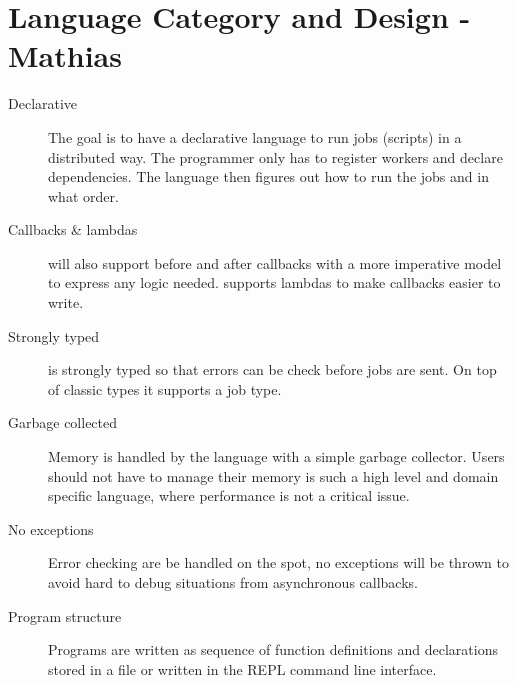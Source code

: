 \section{Language Category and Design - Mathias}
\label{sect:desg}
\begin{description}
\item[Declarative] The goal is to have a declarative language to run jobs
(scripts) in a distributed way. The programmer only has to register workers and
declare dependencies. The language then figures out how to run the jobs and in
what order.
\item[Callbacks \& lambdas] \lang will also support before and after callbacks
with a more imperative model to express any logic needed. \lang supports
lambdas to make callbacks easier to write.
\item[Strongly typed] \lang is strongly typed so that errors can be check
before jobs are sent. On top of classic types it supports a job type.
\item[Garbage collected] Memory is handled by the language with a simple
garbage collector. Users should not have to manage their memory is such a high
level and domain specific language, where performance is not a critical issue.
\item[No exceptions] Error checking are be handled on the spot, no exceptions
will be thrown to avoid hard to debug situations from asynchronous callbacks.
\item[Program structure] Programs are written as sequence of function
definitions and declarations stored in a file or written in the REPL command line
interface.
\end{description}
